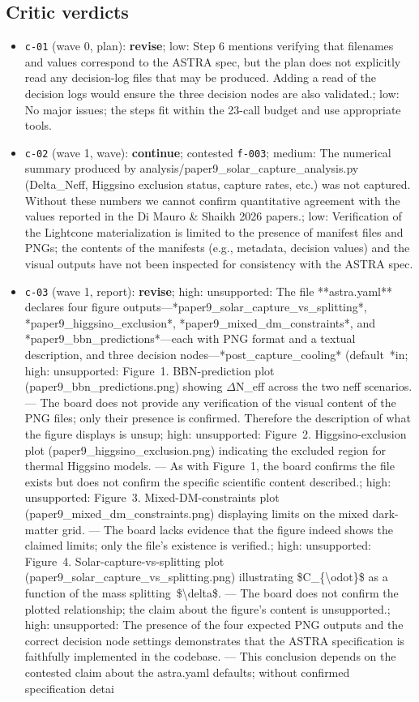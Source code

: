 \documentclass[11pt,a4paper]{article}
\begin{document}
\subsection{Critic verdicts}
\begin{itemize}
  \item \texttt{c-01} (wave 0, plan): \textbf{revise}; low: Step 6 mentions verifying that filenames and values correspond to the ASTRA spec, but the plan does not explicitly read any decision-log files that may be produced. Adding a read of the decision logs would ensure the three decision nodes are also validated.; low: No major issues; the steps fit within the 23-call budget and use appropriate tools.
  \item \texttt{c-02} (wave 1, wave): \textbf{continue}; contested \texttt{f-003}; medium: The numerical summary produced by analysis/paper9\_solar\_capture\_analysis.py (Delta\_Neff, Higgsino exclusion status, capture rates, etc.) was not captured. Without these numbers we cannot confirm quantitative agreement with the values reported in the Di Mauro \& Shaikh 2026 papers.; low: Verification of the Lightcone materialization is limited to the presence of manifest files and PNGs; the contents of the manifests (e.g., metadata, decision values) and the visual outputs have not been inspected for consistency with the ASTRA spec.
  \item \texttt{c-03} (wave 1, report): \textbf{revise}; high: unsupported: The file **astra.yaml** declares four figure outputs---*paper9\_solar\_capture\_vs\_splitting*, *paper9\_higgsino\_exclusion*, *paper9\_mixed\_dm\_constraints*, and *paper9\_bbn\_predictions*---each with PNG format and a textual description, and three decision nodes---*post\_capture\_cooling* (default~*in; high: unsupported: Figure~1. BBN-prediction plot (paper9\_bbn\_predictions.png) showing $\Delta$N\_eff across the two neff scenarios. --- The board does not provide any verification of the visual content of the PNG files; only their presence is confirmed. Therefore the description of what the figure displays is unsup; high: unsupported: Figure~2. Higgsino-exclusion plot (paper9\_higgsino\_exclusion.png) indicating the excluded region for thermal Higgsino models. --- As with Figure~1, the board confirms the file exists but does not confirm the specific scientific content described.; high: unsupported: Figure~3. Mixed-DM-constraints plot (paper9\_mixed\_dm\_constraints.png) displaying limits on the mixed dark-matter grid. --- The board lacks evidence that the figure indeed shows the claimed limits; only the file's existence is verified.; high: unsupported: Figure~4. Solar-capture-vs-splitting plot (paper9\_solar\_capture\_vs\_splitting.png) illustrating \$C\_\{\textbackslash{}odot\}\$ as a function of the mass splitting~\$\textbackslash{}delta\$. --- The board does not confirm the plotted relationship; the claim about the figure's content is unsupported.; high: unsupported: The presence of the four expected PNG outputs and the correct decision node settings demonstrates that the ASTRA specification is faithfully implemented in the codebase. --- This conclusion depends on the contested claim about the astra.yaml defaults; without confirmed specification detai

\end{itemize}
\end{document}
